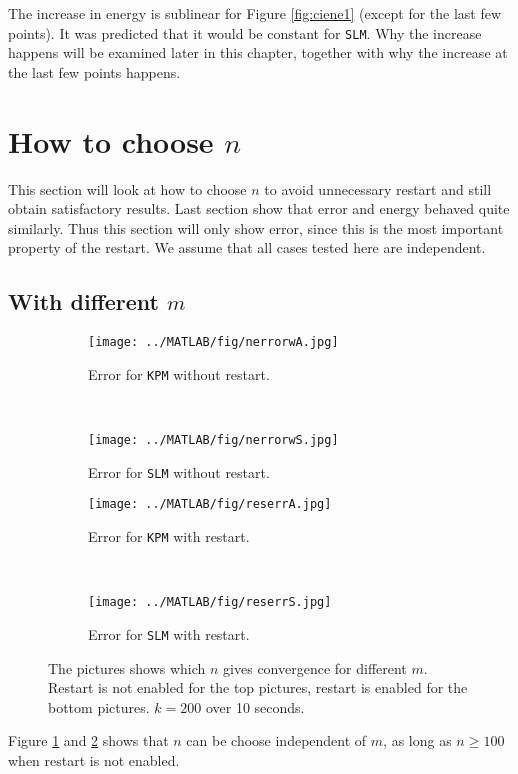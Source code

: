 \noindent The increase in energy is sublinear for Figure \ref{fig:ciene1} (except for the last few points). It was predicted that it would be constant for \texttt{SLM}. Why the increase happens will be examined later in this chapter, together with why the increase at the last few points happens.

\section{How to choose $n$}%
\label{sec:resultat}
This section will look at how to choose $n$ to avoid unnecessary restart and still obtain satisfactory results. Last section show that error and energy behaved quite similarly. Thus this section will only show error, since this is the most important property of the restart. We assume that all cases tested here are independent.

\subsection{With different $m$} %
\begin{figure}[H]
        \centering
        \begin{subfigure}[b]{0.3\textwidth}
                \texttt{[image: ../MATLAB/fig/nerrorwA.jpg]}
                \caption{ Error for \texttt{KPM} without restart. }
                \label{fig:nerrorwA}
        \end{subfigure}
        ~
        \begin{subfigure}[b]{0.3\textwidth}
                \texttt{[image: ../MATLAB/fig/nerrorwS.jpg]}
                \caption{ Error for \texttt{SLM} without restart. }
                \label{fig:nerrorwS}
        \end{subfigure}
        
		\begin{subfigure}[b]{0.3\textwidth}
                \texttt{[image: ../MATLAB/fig/reserrA.jpg]}
                \caption{ Error for \texttt{KPM} with restart. }
                \label{fig:reserrA}
        \end{subfigure}
		~
		\begin{subfigure}[b]{0.3\textwidth}
                \texttt{[image: ../MATLAB/fig/reserrS.jpg]}
                \caption{ Error for \texttt{SLM} with restart. }
                \label{fig:reseneS}
        \end{subfigure}
        \caption{ The pictures shows which $n$ gives convergence for different $m$. Restart is not enabled for the top pictures, restart is enabled for the bottom pictures. $k = 200$ over 10 seconds. }
        \label{fig:n}
\end{figure}
Figure \ref{fig:nerrorwA} and \ref{fig:nerrorwS} shows that $n$ can be choose independent of $m$, as long as $n \geq 100$ when restart is not enabled. \\

